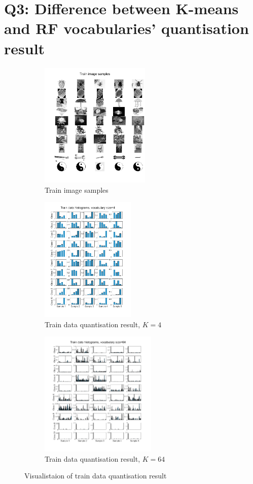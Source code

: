 \section{Q3: Difference between K-means and RF vocabularies' quantisation result}
\label{subsec:Q3-app2}
\begin{figure}[htbp]
	\centering
	\begin{subfigure}[t]{0.3\linewidth}
		\centering
		\includegraphics[height=6cm]{image/q1-appendix/train_img.png} 
		\caption{Train image samples}
	\end{subfigure}%
	\hfill
	\begin{subfigure}[t]{0.3\linewidth}
		\centering
		\includegraphics[height=6cm]{image/q1-appendix/train_4.png}
		\caption{Train data quantisation result, $K=4$}
	\end{subfigure}
	\hfill
	\begin{subfigure}[t]{0.3\linewidth}
		\centering
		\includegraphics[height=6cm]{image/q1-appendix/train_64.png}
		\caption{Train data quantisation result, $K=64$}
	\end{subfigure}
	\caption{Visualistaion of train data quantisation result}
	\label{fig:q1_histogram_tr}
\end{figure}


